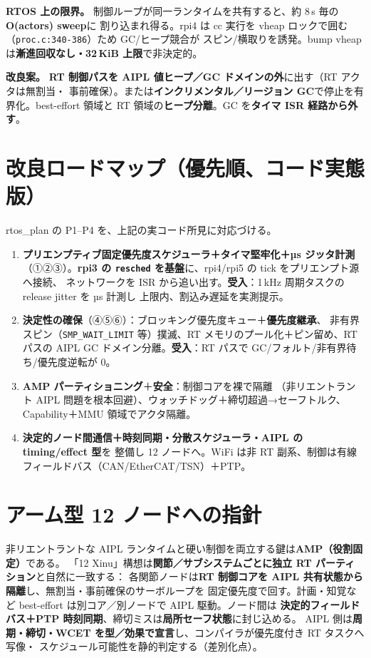 \documentclass[11pt,a4paper]{article}
\newcommand{\code}[1]{\texttt{\small #1}}
\newcommand{\limt}[1]{\textbf{\textcolor{red!55!black}{#1}}}
\newcommand{\fix}[1]{\textbf{\textcolor{green!35!black}{#1}}}
\begin{document}
\limt{RTOS 上の限界。} 制御ループが同一ランタイムを共有すると、約 8\,s 毎の\textbf{O(actors) sweep}に
割り込まれ得る。rpi4 は cc 実行を vheap ロックで囲む（\code{proc.c:340-386}）ため GC/ヒープ競合が
スピン/横取りを誘発。bump vheap は\textbf{漸進回収なし・32\,KiB 上限}で非決定的。

\fix{改良案。} \textbf{RT 制御パスを AIPL 値ヒープ／GC ドメインの外}に出す（RT アクタは無割当・
事前確保）。または\textbf{インクリメンタル／リージョン GC}で停止を有界化。best-effort 領域と
RT 領域の\textbf{ヒープ分離}。GC を\textbf{タイマ ISR 経路から外す}。

\section{改良ロードマップ（優先順、コード実態版）}
rtos\_plan の P1--P4 を、上記の実コード所見に対応づける。

\begin{enumerate}[leftmargin=1.8em,itemsep=3pt]
\item[\textbf{P1}] \textbf{プリエンプティブ固定優先度スケジューラ＋タイマ堅牢化＋µs ジッタ計測}
  （①②③）。\textbf{rpi3 の \code{resched} を基盤}に、rpi4/rpi5 の tick をプリエンプト源へ接続、
  ネットワークを ISR から追い出す。\textbf{受入}：1\,kHz 周期タスクの release jitter を µs 計測し
  上限内、割込み遅延を実測提示。
\item[\textbf{P2}] \textbf{決定性の確保}（④⑤⑥）：ブロッキング優先度キュー＋\textbf{優先度継承}、
  非有界スピン（\code{SMP\_WAIT\_LIMIT} 等）撲滅、RT メモリのプール化＋ピン留め、RT パスの
  AIPL GC ドメイン分離。\textbf{受入}：RT パスで GC/フォルト/非有界待ち/優先度逆転が 0。
\item[\textbf{P3}] \textbf{AMP パーティショニング}＋\textbf{安全}：制御コアを裸で隔離
  （非リエントラント AIPL 問題を根本回避）、ウォッチドッグ＋締切超過→セーフトルク、
  Capability＋MMU 領域でアクタ隔離。
\item[\textbf{P4}] \textbf{決定的ノード間通信＋時刻同期・分散スケジューラ・AIPL の timing/effect 型}を
  整備し 12 ノードへ。WiFi は非 RT 副系、制御は有線フィールドバス（CAN/EtherCAT/TSN）＋PTP。
\end{enumerate}

\section{アーム型 12 ノードへの指針}
非リエントラントな AIPL ランタイムと硬い制御を両立する鍵は\textbf{AMP（役割固定）}である。
「12 Xinu」構想は\textbf{関節／サブシステムごとに独立 RT パーティション}と自然に一致する：
各関節ノードは\textbf{RT 制御コアを AIPL 共有状態から隔離}し、無割当・事前確保のサーボループを
固定優先度で回す。計画・知覚など best-effort は別コア／別ノードで AIPL 駆動。ノード間は
\textbf{決定的フィールドバス＋PTP 時刻同期}、締切ミスは\textbf{局所セーフ状態}に封じ込める。
AIPL 側は\textbf{周期・締切・WCET を型／効果で宣言}し、コンパイラが優先度付き RT タスクへ写像・
スケジュール可能性を静的判定する（差別化点）。
\end{document}
